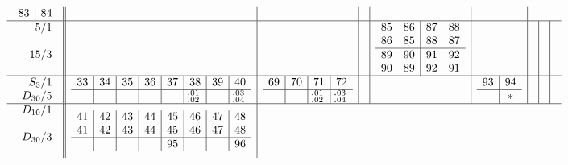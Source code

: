 \documentclass[12pt,a4paper]{amsart}
\begin{document}
\begin{align*}
\begin{array}{r||c|c|c|c|c|c|c|c}
\begin{array}{c|c}
          83&84 \\
        \end{array}
&&&&& \\ \hline
    \begin{array}{r}
5/1 \\ \\ 15/3 \\ \\
    \end{array}
    &&&&
         \begin{array}{cc|cc}
85&86&87&88\\
86&85&88&87\\ \hline
89&90&91&92\\
90&89&92&91\\
         \end{array}
&&&& \\ \hline
    \begin{array}{r}
S_3/1 \\ D_{30}/5 \\
    \end{array}
    &
      \begin{array}{c|c|c|c|c|c|c|c}
33&34&35&36&37&38&39&40\\ \hline
&&&&&^{\llap.01}_{\llap.02}&&^{\llap.03}_{\llap.04} \\
      \end{array}
&
      \begin{array}{c|c|c|c}
69&70&71&72\\ \hline
&&^{\llap.01}_{\llap.02}&^{\llap.03}_{\llap.04} \\
      \end{array}
&&&
      \begin{array}{c|c}
93&94\\ \hline
&* \\
      \end{array}
&&& \\ \hline
    \begin{array}{r}
D_{10}/1 \\ \\ D_{30}/3 \\ \\
    \end{array}
    &
      \begin{array}{c|c|c|c|c|c|c|c}
41&42&43&44&45&46&47&48\\
41&42&43&44&45&46&47&48\\ \hline
  &  &  &  &95&  &  &96\\

\end{array}
\end{array}
\end{align*}
\end{document}
